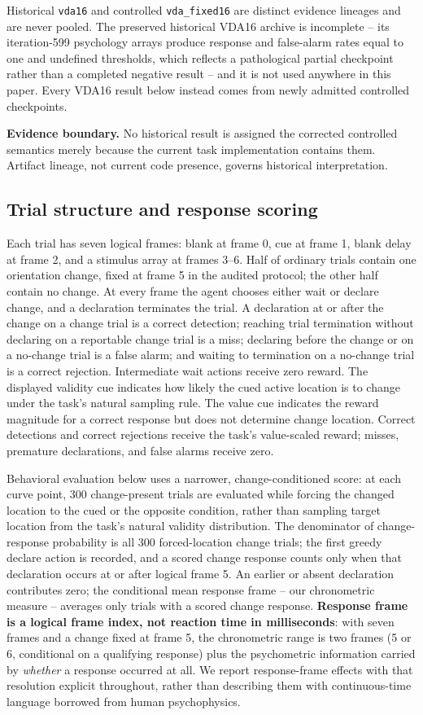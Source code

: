 \documentclass[11pt,a4paper]{article}
\newcommand{\boundary}[1]{\par\smallskip\noindent\colorbox{VdaLight}{\parbox{0.96\linewidth}{\textbf{Evidence boundary.} #1}}\par\smallskip}
\newcommand{\env}[1]{\texttt{#1}}
\begin{document}
Historical \env{vda16} and controlled \env{vda\_fixed16} are distinct evidence lineages and are never pooled. The preserved historical VDA16 archive is incomplete -- its iteration-599 psychology arrays produce response and false-alarm rates equal to one and undefined thresholds, which reflects a pathological partial checkpoint rather than a completed negative result -- and it is not used anywhere in this paper. Every VDA16 result below instead comes from newly admitted controlled checkpoints. \boundary{No historical result is assigned the corrected controlled semantics merely because the current task implementation contains them. Artifact lineage, not current code presence, governs historical interpretation.}

\subsection{Trial structure and response scoring}\label{sec:trial-structure}
Each trial has seven logical frames: blank at frame 0, cue at frame 1, blank delay at frame 2, and a stimulus array at frames 3--6. Half of ordinary trials contain one orientation change, fixed at frame 5 in the audited protocol; the other half contain no change. At every frame the agent chooses either wait or declare change, and a declaration terminates the trial. A declaration at or after the change on a change trial is a correct detection; reaching trial termination without declaring on a reportable change trial is a miss; declaring before the change or on a no-change trial is a false alarm; and waiting to termination on a no-change trial is a correct rejection. Intermediate wait actions receive zero reward. The displayed validity cue indicates how likely the cued active location is to change under the task's natural sampling rule. The value cue indicates the reward magnitude for a correct response but does not determine change location. Correct detections and correct rejections receive the task's value-scaled reward; misses, premature declarations, and false alarms receive zero.

Behavioral evaluation below uses a narrower, change-conditioned score: at each curve point, 300 change-present trials are evaluated while forcing the changed location to the cued or the opposite condition, rather than sampling target location from the task's natural validity distribution. The denominator of change-response probability is all 300 forced-location change trials; the first greedy declare action is recorded, and a scored change response counts only when that declaration occurs at or after logical frame 5. An earlier or absent declaration contributes zero; the conditional mean response frame -- our chronometric measure -- averages only trials with a scored change response. \textbf{Response frame is a logical frame index, not reaction time in milliseconds}: with seven frames and a change fixed at frame 5, the chronometric range is two frames (5 or 6, conditional on a qualifying response) plus the psychometric information carried by \emph{whether} a response occurred at all. We report response-frame effects with that resolution explicit throughout, rather than describing them with continuous-time language borrowed from human psychophysics.
\end{document}
